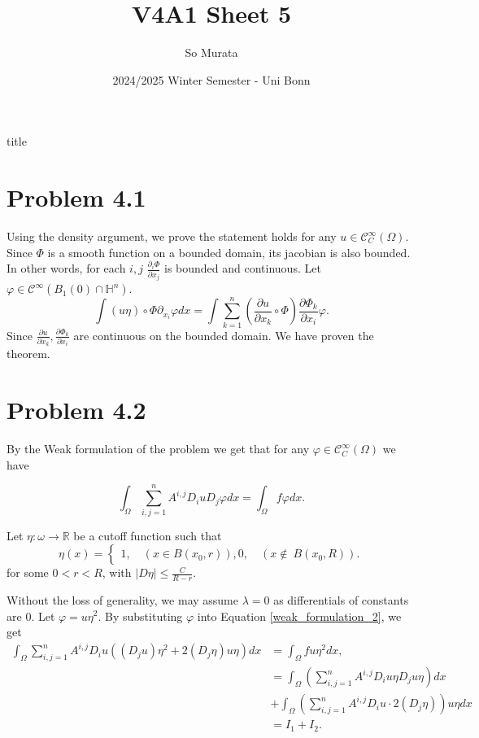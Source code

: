 \documentclass{article}
\title{V4A1 Sheet 5}
\author{So Murata}
\date{2024/2025 Winter Semester - Uni Bonn}
\begin{document}
\make title
\section*{Problem 4.1}

Using the density argument, we prove the statement holds for any $u\in\mathcal{C}^\infty_C(\Omega)$. Since $\Phi$ is a smooth function on a bounded domain, its jacobian is also bounded. In other words, for each $i,j$ ${\frac {\partial_i\Phi} {\partial x_j}}$ is bounded and continuous. Let $\varphi\in\mathcal{C}^\infty(B_1(0)\cap\mathbb{H}^n)$.
\begin{equation*}
\int (u\eta)\circ\Phi \partial_{x_i}\varphi dx = \int \sum_{k=1}^n ({\frac {\partial u} {\partial x_k}}\circ \Phi){\frac {\partial \Phi_k} {\partial x_i}}\varphi.
\end{equation*}
Since ${\frac {\partial u} {\partial x_k}},{\frac {\partial \Phi_k} {\partial x_i}}$ are continuous on the bounded domain. We have proven the theorem.
\section*{Problem 4.2}

By the Weak formulation of the problem we get that for any $\varphi\in\mathcal{C}^\infty_C(\Omega)$ we have

\begin{equation}
\int_\Omega \sum_{i,j=1}^n A^{i,j}D_iuD_j\varphi dx = \int_\Omega f\varphi dx.
\label{weak_formulation_2}
\end{equation}

Let $\eta:\omega\to\mathbb{R}$ be a cutoff function such that
\begin{equation*}
\eta(x) = 
\begin{cases}
1,\quad(x\in B(x_0,r)),
0, \quad (x\not\in\ B(x_0,R)).
\end{cases}
\end{equation*}
for some $0<r<R$, with $|D\eta|\leq {\frac C {R-r}}$.\\
\par Without the loss of generality, we may assume $\lambda=0$ as differentials of constants are $0$. Let $\varphi=u\eta^2$. 
By substituting $\varphi$ into Equation \eqref{weak_formulation_2}, we get
\begin{align*}
\int_\Omega \sum_{i,j=1}^n A^{i,j}D_iu((D_ju)\eta^2+2(D_j\eta)u\eta) dx &= \int_\Omega fu\eta^2 dx,\\
& =\int_\Omega \left(\sum_{i,j=1}^n A^{i,j}D_iu\eta D_ju\eta\right) dx\\
&+\int_\Omega\left(\sum_{i,j=1}^n A^{i,j}D_iu\cdot 2(D_j\eta)\right)u\eta  dx\\
& = I_1+I_2.
\end{align*}
\end{document}
